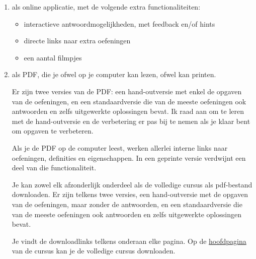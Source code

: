 \documentclass{ximera}
\begin{document}
\begin{enumerate}
 
   \item als online applicatie, met de volgende extra functionaliteiten:
        \begin{itemize}
            \item interactieve antwoordmogelijkheden, met feedback en/of hints
            \item directe links naar extra oefeningen 
            \item een aantal filmpjes
        \end{itemize}
        
        
     \item als PDF, die je ofwel op je computer kan lezen, ofwel kan printen.
            \par
            Er zijn twee versies van de PDF: een hand-outversie met enkel de opgaven van de oefeningen, en een standaardversie die van de meeste oefeningen ook antwoorden en zelfs uitgewerkte oplossingen bevat. Ik raad aan om te leren met de hand-outversie en de verbetering er pas bij te nemen als je klaar bent om opgaven te verbeteren.
             
            Als je de PDF op de computer leest, werken allerlei interne links naar oefeningen, definities en eigenschappen. In een geprinte versie verdwijnt een deel van die functionaliteit.
            
            Je kan zowel elk afzonderlijk onderdeel als de volledige cursus als pdf-bestand downloaden. Er zijn telkens twee versies, een hand-outversie met de opgaven van de oefeningen, maar zonder de antwoorden, en een standaardversie die van de meeste oefeningen ook antwoorden en zelfs uitgewerkte oplossingen bevat.
        
            \begin{onlineOnly}
                Je vindt de downloadlinks telkens onderaan elke pagina. Op de \href{https://xerxes.ximera.org/sui/5de/Cursus_DDO}{hoofdpagina} van de cursus kan je de volledige cursus downloaden.
            \end{onlineOnly}

\end{enumerate}
 
\end{document}

